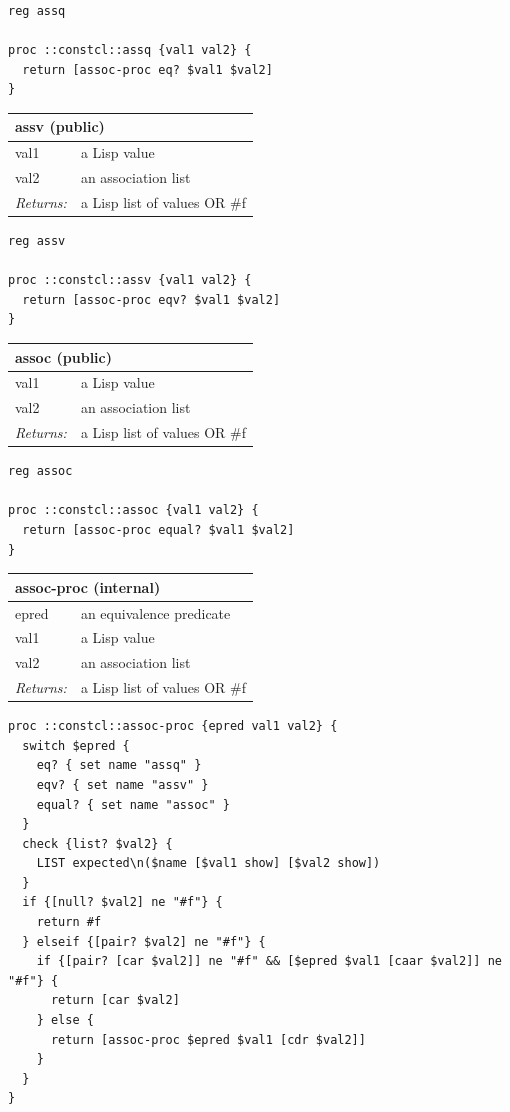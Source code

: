 \documentclass[twoside,9pt]{report}
\begin{document}
\noindent\makebox[\linewidth]{\rule{\linewidth}{0.4pt}}
\begin{lstlisting}
reg assq
 
proc ::constcl::assq {val1 val2} {
  return [assoc-proc eq? $val1 $val2]
}
\end{lstlisting}
\noindent\makebox[\linewidth]{\rule{\linewidth}{0.4pt}}
\begin{tabular}{ |l l| }
\hline
\multicolumn{2}{|l|}{assv (public)} \\
\hline
val1 & a Lisp value \\
val2 & an association list \\
\textit{Returns:} & a Lisp list of values OR \#f \\
\hline
\end{tabular}

\noindent\makebox[\linewidth]{\rule{\linewidth}{0.4pt}}
\begin{lstlisting}
reg assv
 
proc ::constcl::assv {val1 val2} {
  return [assoc-proc eqv? $val1 $val2]
}
\end{lstlisting}
\noindent\makebox[\linewidth]{\rule{\linewidth}{0.4pt}}
\begin{tabular}{ |l l| }
\hline
\multicolumn{2}{|l|}{assoc (public)} \\
\hline
val1 & a Lisp value \\
val2 & an association list \\
\textit{Returns:} & a Lisp list of values OR \#f \\
\hline
\end{tabular}

\noindent\makebox[\linewidth]{\rule{\linewidth}{0.4pt}}
\begin{lstlisting}
reg assoc
 
proc ::constcl::assoc {val1 val2} {
  return [assoc-proc equal? $val1 $val2]
}
\end{lstlisting}
\noindent\makebox[\linewidth]{\rule{\linewidth}{0.4pt}}
\begin{tabular}{ |l l| }
\hline
\multicolumn{2}{|l|}{assoc-proc (internal)} \\
\hline
epred & an equivalence predicate \\
val1 & a Lisp value \\
val2 & an association list \\
\textit{Returns:} & a Lisp list of values OR \#f \\
\hline
\end{tabular}

\noindent\makebox[\linewidth]{\rule{\linewidth}{0.4pt}}
\begin{lstlisting}
proc ::constcl::assoc-proc {epred val1 val2} {
  switch $epred {
    eq? { set name "assq" }
    eqv? { set name "assv" }
    equal? { set name "assoc" }
  }
  check {list? $val2} {
    LIST expected\n($name [$val1 show] [$val2 show])
  }
  if {[null? $val2] ne "#f"} {
    return #f
  } elseif {[pair? $val2] ne "#f"} {
    if {[pair? [car $val2]] ne "#f" && [$epred $val1 [caar $val2]] ne "#f"} {
      return [car $val2]
    } else {
      return [assoc-proc $epred $val1 [cdr $val2]]
    }
  }
}
\end{lstlisting}
\noindent\makebox[\linewidth]{\rule{\linewidth}{0.4pt}}
\end{document}
